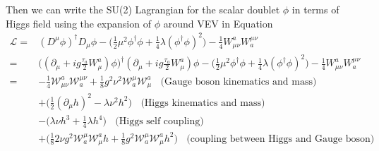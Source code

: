 







\noindent Then we can write the SU(2) Lagrangian for the scalar doublet $\phi$ in terms of Higgs field using the expansion of $\phi$ around VEV in Equation~\label{eqn:relatedWorks:qft:u1Higgs}
\begin{equation}
\begin{split}
    \mathcal{L} =& (D^\mu \phi)^\dagger D_\mu \phi - \big(\frac{1}{2} \mu^2 \phi^\dagger\phi + \frac{1}{4} \lambda(\phi^\dagger\phi )^2 \big) - \frac{1}{4} W^a_{\mu\nu}W^{\mu\nu}_a \\
    =& \big( (\partial_\mu +i g \frac{\tau_a}{2} W^a_\mu)  \phi \big)^\dagger (\partial_\mu +i g \frac{\tau_a}{2} W^a_\mu ) \phi - \big(\frac{1}{2} \mu^2 \phi^\dagger\phi + \frac{1}{4} \lambda(\phi^\dagger\phi )^2 \big) - \frac{1}{4} W^a_{\mu\nu}W^{\mu\nu}_a \\
    = & - \frac{1}{4} \mathcal{W}^a_{\mu\nu} \mathcal{W}^{\mu\nu}_a + \frac{1}{8} g^2 \nu^2 \mathcal{W}^{\mu}_a \mathcal{W}_{\mu}^a \;\; \text{ (Gauge boson kinematics and mass) } \\
    & + \big(\frac{1}{2} (\partial_\mu h)^2 -\lambda\nu^2h^2\big)  \;\; \text{ (Higgs kinematics and mass) } \\
    & - \big ( \lambda \nu h^3 + \frac{1}{4}\lambda h^4 \big) \;\; \text{ (Higgs self coupling) } \\
    & + \big( \frac{1}{8} 2\nu g^2 \mathcal{W}^{\mu}_a \mathcal{W}_{\mu}^a h  + \frac{1}{8} g^2  \mathcal{W}^{\mu}_a \mathcal{W}_{\mu}^a h^2 \big)   \;\; \text{ (coupling between Higgs and Gauge boson) }
\end{split}
\end{equation}


